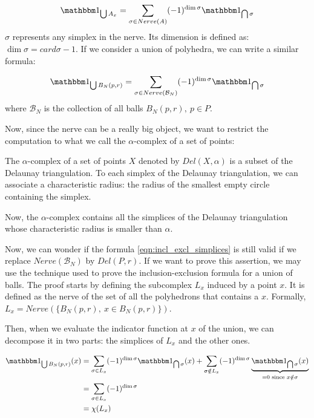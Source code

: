 $$ \indicator{\bigcup A_x} = \sum_{\sigma \in Nerve(A)} (-1)^{\dim \sigma}
\indicator{\bigcap \sigma} $$
$ \sigma $ represents any simplex in the nerve. Its dimension is defined as: $
\dim \sigma = card \sigma - 1 $. If we consider a union of polyhedra, we can write a similar formula:

\begin{equation}
    \indicator{\bigcup B_N(p, r)} = \sum_{\sigma \in Nerve(\mathcal{B}_N)} (-1)^{\dim \sigma}
    \indicator{\bigcap \sigma}
    \label{eqn:incl_excl_simplices}
\end{equation}
where $ \mathcal{B}_N $ is the collection of all balls $ B_N(p, r),~p \in P $.

Now, since the nerve can be a really big object, we want to restrict the
computation to what we call the $\alpha$-complex of a set of points:

\begin{definition} The $\alpha$-complex of a set of points $ X $ denoted by $
    Del(X, \alpha) $ is a subset of the Delaunay triangulation. To each simplex
    of the Delaunay triangulation, we can associate a characteristic
    radius: the radius of the smallest empty circle containing the simplex.

    Now, the $\alpha$-complex contains all the simplices of the Delaunay
    triangulation whose characteristic radius is smaller than $\alpha$.
\end{definition}

Now, we can wonder if the formula \ref{eqn:incl_excl_simplices} is still valid
if we replace $ Nerve(\mathcal{B}_N) $ by $ Del(P, r) $.  If we want to prove
this assertion, we may use the technique used to prove the inclusion-exclusion
formula for a union of balls. The proof starts by defining the subcomplex $ L_x
$ induced by a point $ x $. It is defined as the nerve of the set of all the
polyhedrons that contains a $ x $. Formally, $ L_x = Nerve(\{ B_N(p, r),~x \in
B_N(p, r)\}) $.

Then, when we evaluate the indicator function at $ x $ of the union, we can
decompose it in two parts: the simplices of $ L_x $ and the other ones.

\begin{align*}
    \indicator{\bigcup B_N(p, r)}(x) &= \sum_{\sigma \in L_x} (-1)^{\dim \sigma}
    \indicator{\bigcap \sigma}(x) + \sum_{\sigma \notin L_x} (-1)^{\dim \sigma}
    \underbrace{\indicator{\bigcap \sigma}(x)}_{= 0 \text{ since } x \notin
        \sigma} \\
    &= \sum_{\sigma \in L_x} (-1)^{\dim \sigma} \\
    &= \chi(L_x)
\end{align*}

